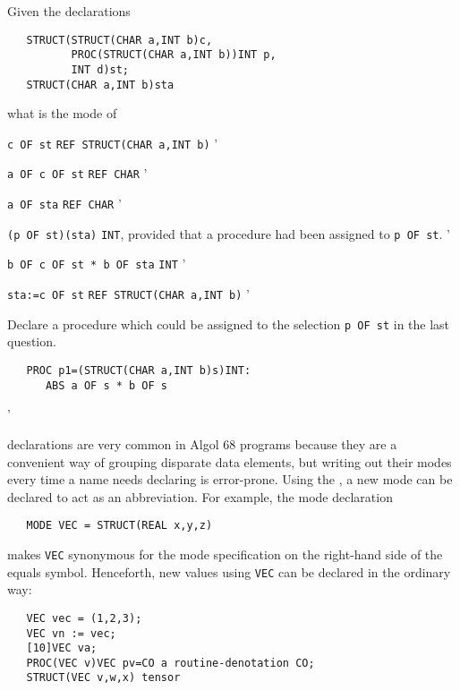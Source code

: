 \begin{exercise}
\item Given the declarations
\begin{verbatim}
   STRUCT(STRUCT(CHAR a,INT b)c,
          PROC(STRUCT(CHAR a,INT b))INT p,
          INT d)st;
   STRUCT(CHAR a,INT b)sta
\end{verbatim}
\noindent
what is the mode of
\begin{subex}
\item \verb|c OF st| \subans \verb|REF STRUCT(CHAR a,INT b)|
'
\item \verb|a OF c OF st| \subans \verb|REF CHAR|
'
\item \verb|a OF sta| \subans \verb|REF CHAR|
'
\item \verb|(p OF st)(sta)| \subans \verb|INT|, provided that a
procedure had been assigned to \verb|p OF st|.
'
\item \verb|b OF c OF st * b OF sta| \subans \verb|INT|
'
\item \verb|sta:=c OF st| \subans \verb|REF STRUCT(CHAR a,INT b)|
'
\end{subex}
\item Declare a procedure which could be assigned to the selection
\verb|p OF st| in the last question. \ans \ %
\begin{verbatim}
   PROC p1=(STRUCT(CHAR a,INT b)s)INT:
      ABS a OF s * b OF s
\end{verbatim}
'
\end{exercise}

 declarations are very common
in Algol 68 programs because they are a convenient way of grouping
disparate data elements, but writing out their modes every time a
name needs declaring is error-prone.  Using the
, a new mode  can
be declared to act as an abbreviation.  For example, the mode
declaration
\begin{verbatim}
   MODE VEC = STRUCT(REAL x,y,z)
\end{verbatim}
\noindent
makes \verb|VEC| synonymous for the mode specification on the
right-hand side of the equals symbol. Henceforth, new values using
\verb|VEC| can be declared in the ordinary way:
\begin{verbatim}
   VEC vec = (1,2,3);
   VEC vn := vec;
   [10]VEC va;
   PROC(VEC v)VEC pv=CO a routine-denotation CO;
   STRUCT(VEC v,w,x) tensor
\end{verbatim}


